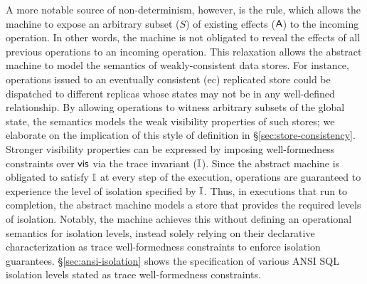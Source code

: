 A more notable source of non-determinism, however, is the
 rule, which allows the machine to expose an
arbitrary subset ($S$) of existing effects ($\textsf{A}$) to the incoming
operation. In other words, the machine is not obligated to reveal the
effects of all previous operations to an incoming operation. This
relaxation allows the abstract machine to model the semantics of
weakly-consistent data stores. For instance, operations issued to an
eventually consistent ({\sc ec}) replicated store could be dispatched
to different replicas whose states may not be in any well-defined
relationship. By allowing operations to witness arbitrary subsets of
the global state, the semantics models the weak visibility properties
of such stores; we elaborate on the implication of this style of
definition in \S\ref{sec:store-consistency}.  Stronger visibility
properties can be expressed by imposing well-formedness constraints
over $\textsf{vis}$ via the trace invariant ($\mathbb{I}$). Since the abstract
machine is obligated to satisfy $\mathbb{I}$ at every step of the execution,
operations are guaranteed to experience the level of isolation
specified by $\mathbb{I}$.  Thus, in executions that run to completion, the
abstract machine models a store that provides the required levels of
isolation.  Notably, the machine achieves this without defining an
operational semantics for isolation levels, instead solely relying on
their declarative characterization as trace well-formedness
constraints to enforce isolation guarantees.
\S\ref{sec:ansi-isolation} shows the specification of various ANSI SQL
isolation levels stated as trace well-formedness constraints.






